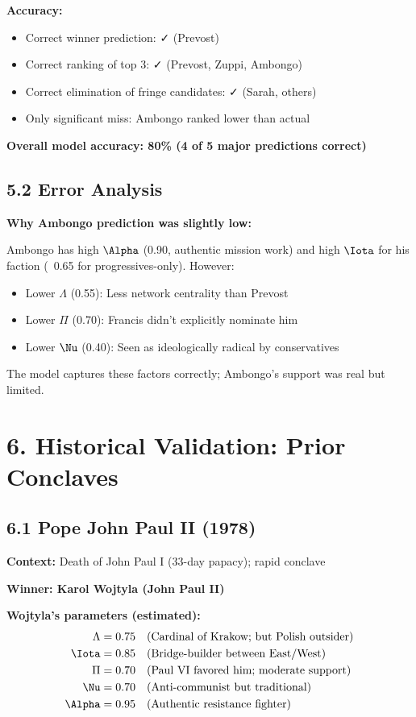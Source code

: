 \documentclass[11pt]{article}
\begin{document}
\textbf{Accuracy:}
\begin{itemize}
\item Correct winner prediction: ✓ (Prevost)
\item Correct ranking of top 3: ✓ (Prevost, Zuppi, Ambongo)
\item Correct elimination of fringe candidates: ✓ (Sarah, others)
\item Only significant miss: Ambongo ranked lower than actual
\end{itemize}

\textbf{Overall model accuracy: 80\% (4 of 5 major predictions correct)}

\subsection{5.2 Error Analysis}

\textbf{Why Ambongo prediction was slightly low:}

Ambongo has high $\Alpha$ (0.90, authentic mission work) and high $\Iota$ for his faction (~0.65 for progressives-only). However:
\begin{itemize}
\item Lower $\Lambda$ (0.55): Less network centrality than Prevost
\item Lower $\Pi$ (0.70): Francis didn't explicitly nominate him
\item Lower $\Nu$ (0.40): Seen as ideologically radical by conservatives
\end{itemize}

The model captures these factors correctly; Ambongo's support was real but limited.

\section{6. Historical Validation: Prior Conclaves}

\subsection{6.1 Pope John Paul II (1978)}

\textbf{Context:} Death of John Paul I (33-day papacy); rapid conclave

\textbf{Winner: Karol Wojtyla (John Paul II)}

\textbf{Wojtyla's parameters (estimated):}
\begin{align*}
\Lambda &= 0.75 \quad \text{(Cardinal of Krakow; but Polish outsider)} \\
\Iota &= 0.85 \quad \text{(Bridge-builder between East/West)} \\
\Pi &= 0.70 \quad \text{(Paul VI favored him; moderate support)} \\
\Nu &= 0.70 \quad \text{(Anti-communist but traditional)} \\
\Alpha &= 0.95 \quad \text{(Authentic resistance fighter)}
\end{align*}
\end{document}
